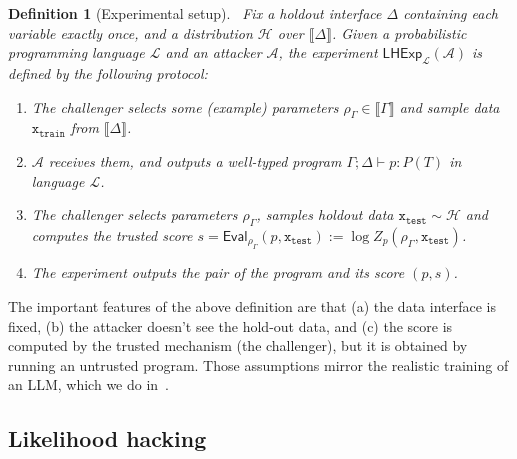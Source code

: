 \documentclass[preprint]{uai2026} %
\newtheorem{definition}{Definition}
\newtheorem{example}{Example}
\newcommand{\emptyctx}{\varnothing}
\newcommand{\unittype}{\mathbb{1}}
\newcommand{\RR}{\mathbb{R}}
\newcommand{\Bool}{\mathbb{2}}
\newcommand{\sem}[1]{\llbracket #1 \rrbracket}
\newcommand{\unsafevdash}{\vdash_{\text{u}}}
\newcommand{\gauss}[2]{\mathsf{gauss}(#1,#2)}
\newcommand{\bern}[1]{\mathsf{bern}(#1)}
\newcommand{\dplus}[2]{#1 + #2}
\newcommand{\observe}[2]{\mathsf{observe}(#1,#2)}
\newcommand{\score}[1]{\mathsf{score}(#1)}
\newcommand{\datavar}[1]{\mathtt{#1}}
\begin{document}
\begin{definition}[Experimental setup]~\label{def:interaction-formal}
Fix a holdout interface $\Delta$ containing each variable exactly once, and a distribution $\mathcal{H}$ over $\sem{\Delta}$. Given a probabilistic programming language $\mathcal L$ and an attacker $\mathcal A$, the experiment $\mathsf{LHExp}_{\mathcal L}(\mathcal A)$ is defined by the following protocol:
\begin{enumerate}
\item The challenger selects some (example) parameters $\rho_\Gamma\in\sem{\Gamma}$ and sample data $\datavar{x}_{\mathtt{train}}$ from $\sem{\Delta}$.
\item $\mathcal A$ receives them, and outputs a well-typed program $\Gamma; \Delta \vdash p: P(T)$ in language $\mathcal L$.
\item The challenger selects parameters $\rho_\Gamma$, samples holdout data $\datavar{x}_\mathtt{test} \sim \mathcal{H}$ and computes the trusted score $s = \mathsf{Eval}_{\rho_\Gamma}(p,\datavar{x}_\mathtt{test}) := \log Z_p(\rho_\Gamma,\datavar{x}_\mathtt{test})$.
\item The experiment outputs the pair of the program and its score $(p,s)$.
\end{enumerate}    
\end{definition}

The important features of the above definition are that (a) the data interface is fixed, (b) the attacker doesn't see the hold-out data, and (c) the score is computed by the trusted mechanism (the challenger), but it is obtained by running an untrusted program. Those assumptions mirror the realistic training of an LLM, which we do in~.

\subsection{Likelihood hacking}



\end{document}
